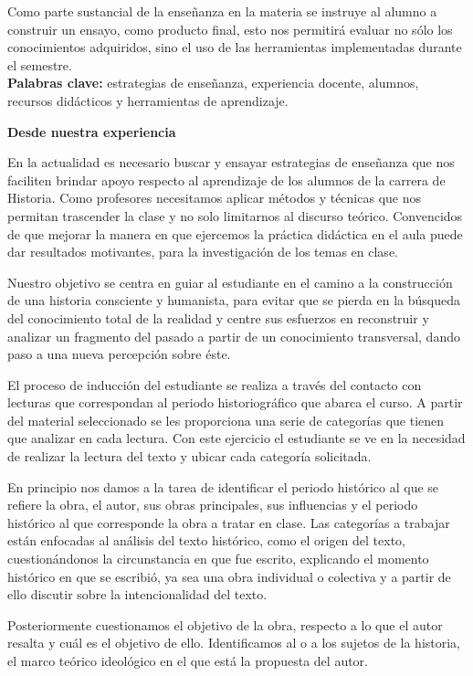 Como parte sustancial de la enseñanza en la materia se instruye al 
alumno a construir un ensayo, como producto final, esto nos permitirá 
evaluar no sólo los conocimientos adquiridos, sino el uso de las 
herramientas implementadas durante el semestre.\\
{\bfseries Palabras clave:} estrategias de enseñanza, experiencia docente, alumnos, 
recursos didácticos y herramientas de aprendizaje.


\bigskip
\textbf{Desde nuestra experiencia}


En la actualidad es necesario buscar y ensayar estrategias de enseñanza 
que nos faciliten brindar apoyo respecto al aprendizaje de los alumnos 
de la carrera de Historia. Como profesores necesitamos aplicar métodos 
y técnicas que nos permitan trascender la clase y no solo limitarnos al 
discurso teórico. Convencidos de que mejorar la manera en que ejercemos 
la práctica didáctica en el aula puede dar resultados motivantes, para 
la investigación de los temas en clase. 


Nuestro objetivo se centra en guiar al estudiante en el camino a la 
cons\-truc\-ción de una historia consciente y humanista, para evitar que se 
pierda en la búsqueda del conocimiento total de la realidad y centre 
sus esfuerzos en reconstruir y analizar un fragmento del pasado a 
partir de un conocimiento transversal, dando paso a una nueva 
percepción sobre éste. 
 
El proceso de inducción del estudiante se realiza a través del contacto 
con lecturas que correspondan al periodo historiográfico que abarca el 
curso. A partir del material seleccionado se les proporciona una serie 
de categorías que tienen que analizar en cada lectura. Con este 
ejercicio el estudiante se ve en la necesidad de realizar la lectura 
del texto y ubicar cada categoría solicitada.

En principio nos damos a la tarea de identificar el periodo histórico 
al que se refiere la obra, el autor, sus obras principales, sus 
influencias y el periodo histórico al que corresponde la obra a tratar 
en clase. Las categorías a trabajar están enfocadas al análisis del 
texto histórico, como el origen del texto, cuestionándonos la 
circunstancia en que fue escrito, explicando el momento histórico en 
que se escribió, ya sea una obra individual o colectiva y a partir de 
ello discutir sobre la intencionalidad del texto.

Posteriormente cuestionamos el objetivo de la obra, respecto a lo que 
el autor resalta y cuál es el objetivo de ello. Identificamos al o a 
los sujetos de la historia, el marco teórico ideológico en el que está 
la propuesta del autor. 

